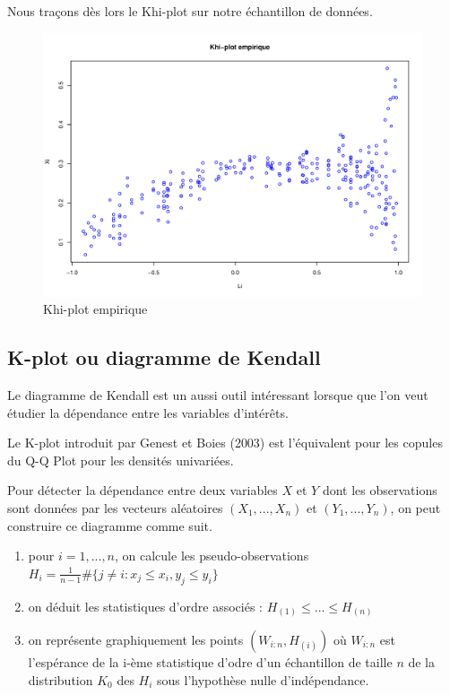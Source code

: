 Nous traçons dès lors le Khi-plot sur notre échantillon de données.

\noindent%
\begin{figure}[H]
    \begin{center}
      \includegraphics[width=14 cm, angle=0]{./pictures/chi_plot_empir.png}
      \centering\caption{Khi-plot empirique}
    \end{center}
\end{figure}



\subsection{K-plot ou diagramme de Kendall}

Le diagramme de Kendall est un aussi outil intéressant lorsque que l'on veut étudier la dépendance entre les variables d'intérêts.

Le K-plot introduit par Genest et Boies (2003) est l'équivalent pour les copules du Q-Q Plot pour les
densités univariées.

Pour détecter la dépendance entre deux variables $X$ et $Y$ dont les observations sont données par les vecteurs aléatoires $(X_1,...,X_n)$ et
$(Y_1,...,Y_n)$, on peut construire ce diagramme comme suit.

\begin{enumerate}
\item pour $i=1,...,n$, on calcule les pseudo-observations $H_i = \frac{1}{n-1} \# \{j \neq i : x_j \leq x_i, y_j \leq y_i \}$
\item on déduit les statistiques d'ordre associés : $H_{(1)} \leq ... \leq H_{(n)}$
\item on représente graphiquement les points $(W_{i:n},H_{(i)})$ où $W_{i:n}$ est l'espérance de la i-ème statistique d'odre 
d'un échantillon de taille $n$ de la distribution $K_0$ des $H_i$ sous l'hypothèse nulle d'indépendance.
\end{enumerate}

